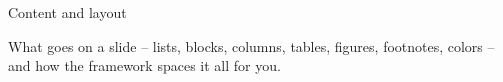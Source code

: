 
\begin{sectionframe}{Content and layout}
	\begin{minipage}[t]{0.9\linewidth}\small
		What goes on a slide -- lists, blocks, columns, tables, figures, footnotes, colors -- and how the framework spaces it all for you.
	\end{minipage}\par\medskip
	\SMChapterAgenda
\end{sectionframe}
